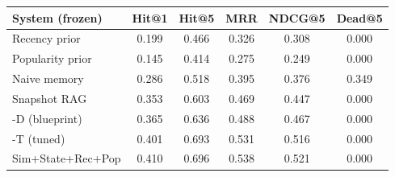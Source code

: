 \begin{tabular}{lccccc}
\toprule
System (frozen) & Hit@1 & Hit@5 & MRR & NDCG@5 & Dead@5 \\
\midrule
Recency prior & 0.199 & 0.466 & 0.326 & 0.308 & 0.000 \\
Popularity prior & 0.145 & 0.414 & 0.275 & 0.249 & 0.000 \\
Naive memory & 0.286 & 0.518 & 0.395 & 0.376 & 0.349 \\
Snapshot RAG & 0.353 & 0.603 & 0.469 & 0.447 & 0.000 \\
\sys{}-D (blueprint) & 0.365 & 0.636 & 0.488 & 0.467 & 0.000 \\
\sys{}-T (tuned) & 0.401 & 0.693 & 0.531 & 0.516 & 0.000 \\
Sim+State+Rec+Pop & 0.410 & 0.696 & 0.538 & 0.521 & 0.000 \\
\bottomrule
\end{tabular}